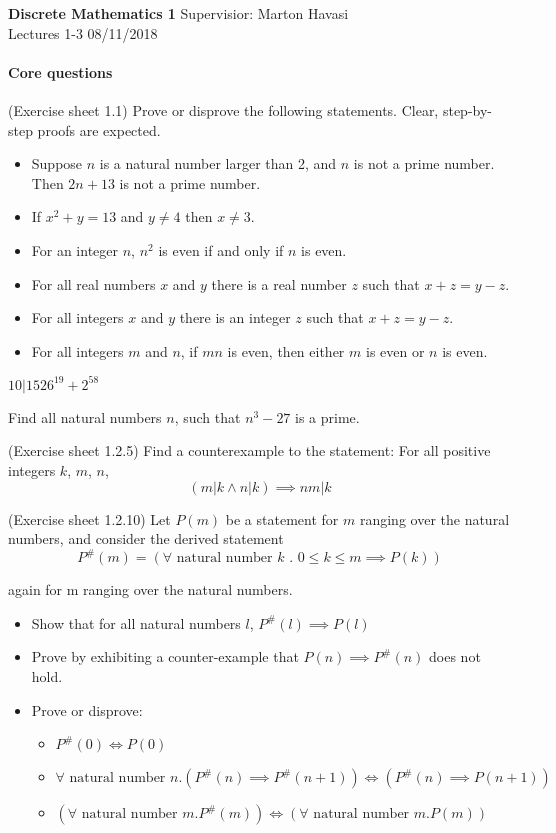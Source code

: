 \documentclass{exam}
\begin{document}
\noindent
\large\textbf{Discrete Mathematics 1} \hfill Supervisior: Marton Havasi \\
\normalsize Lectures 1-3 \hfill 08/11/2018

\paragraph{Core questions}
\begin{questions}
\question (Exercise sheet 1.1) Prove or disprove the following statements. Clear, step-by-step proofs are expected.
\begin{itemize}
\item Suppose $n$ is a natural number larger than 2, and $n$ is not a prime number. Then $2n + 13$ is not a prime
number.

\item If $x^2+y = 13$ and $y\neq 4$ then $x\neq 3$.

\item For an integer $n$, $n^2$ is even if and only if $n$ is even.

\item For all real numbers $x$ and $y$ there is a real number $z$ such that $x + z = y - z$.

\item For all integers $x$ and $y$ there is an integer $z$ such that $x + z = y - z$.

\item For all integers $m$ and $n$, if $mn$ is even, then either $m$ is even or $n$ is even.

\end{itemize}

\question $10|1526^{19}+2^{58}$

\question Find all natural numbers $n$, such that $n^3-27$ is a prime.

\question (Exercise sheet 1.2.5) Find a counterexample to the statement:  For all positive integers $k$, $m$, $n$, $$(m|k \wedge n|k) \implies nm|k$$

\question (Exercise sheet 1.2.10) Let $P(m)$ be a statement for $m$ ranging over the natural numbers, and consider the derived statement $$P^\#(m)=(\forall \text{ natural number } k \text{ . } 0 \leq k \leq m \implies P(k))$$ 

again for m ranging over the natural numbers.

\begin{itemize}
\item Show that for all natural numbers $l$, $P^\#(l)\implies P(l)$
\item Prove by exhibiting a counter-example that $P(n)\implies P^\#(n)$ does not hold.
\item Prove or disprove:
\begin{itemize}
\item $P^\#(0) \iff P(0)$
\item $\forall \text{ natural number } n. (P^\#(n) \implies P^\#(n+1)) \iff (P^\#(n) \implies P(n+1)) $
\item $(\forall \text{ natural number } m.P^\#(m) ) \iff (\forall \text{ natural number } m.P(m) )$
\end{itemize}
\end{itemize}


\end{questions}
\end{document}
